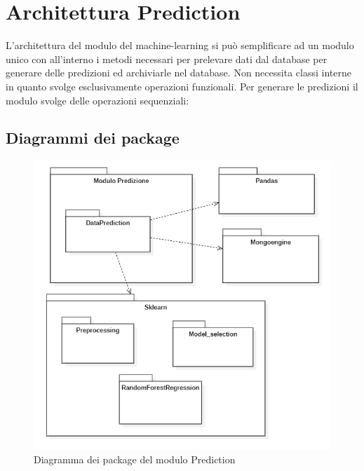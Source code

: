 \section{Architettura Prediction}\label{ArchitetturaDelProdottoPrediction}
L'architettura del modulo del machine-learning si può semplificare ad un modulo unico con all'interno i metodi necessari per prelevare dati dal database per generare delle predizioni ed archiviarle nel database.
Non necessita classi interne in quanto svolge esclusivamente operazioni funzionali. Per generare le predizioni il modulo svolge delle operazioni sequenziali:
\subsection{Diagrammi dei package}
\begin{center}
	\begin{figure}[H]
		\centering\includegraphics[scale=0.8]{../immagini/diag_PB/diag_pack_pred.png}
		\caption{Diagramma dei package del modulo Prediction}
	\end{figure}
\end{center}

